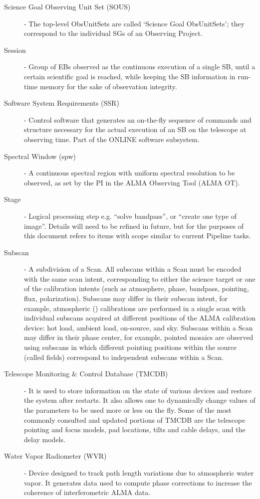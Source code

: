 \begin{description}
\item[Science Goal Observing Unit Set (SOUS)] - The top-level ObsUnitSets are called `Science Goal ObsUnitSets’; they correspond to the individual SGs of an Observing Project. 
\item[Session] - Group of EBs observed as the continuous execution of a single SB, until a certain scientific goal is reached, while keeping the SB information in run-time memory for the sake of observation integrity.
\item[Software System Requirements (SSR)] - Control software that generates an on-the-fly sequence of commands and structure necessary for the actual execution of an SB on the telescope at observing time. Part of the ONLINE software subsystem.
\item[Spectral Window (spw)] - A continuous spectral region with uniform spectral resolution to be observed, as set by the PI in the ALMA Observing Tool (ALMA OT).
\item[Stage] - Logical processing step e.g. ``solve bandpass'', or ``create one type of image''. Details will need to be refined in future, but for the purposes of this document refers to items with scope similar to current Pipeline tasks.
\item[Subscan] - A subdivision of a Scan.
All subscans within a Scan must be encoded with the same scan intent, corresponding to either the science target or one of the calibration intents (such as atmosphere, phase, bandpass, pointing, flux, polarization). Subscans may differ in their subscan intent, for example, atmospheric (\Tsys) calibrations are performed in a single scan with individual subscans acquired at different positions of the ALMA calibration device: hot load, ambient load, on-source, and sky. Subscans within a Scan may differ in their phase center, for example, pointed mosaics are observed using subscans in which different pointing positions within the source (called fields) correspond to independent subscans within a Scan.
\item [Telescope Monitoring \& Control Database (TMCDB)] - It is used to store information on the state of various devices and restore the system after restarts. It also allows one to dynamically change values of the parameters to be used more or less on the fly. Some of the most commonly consulted and updated portions of TMCDB are the telescope pointing and focus models, pad locations, tilts and cable delays, and the delay models.
\item[Water Vapor Radiometer (WVR)] - Device designed to track path length variations due to atmospheric water vapor. It generates data used to compute phase corrections to increase the coherence of interferometric ALMA data.

\end{description}
